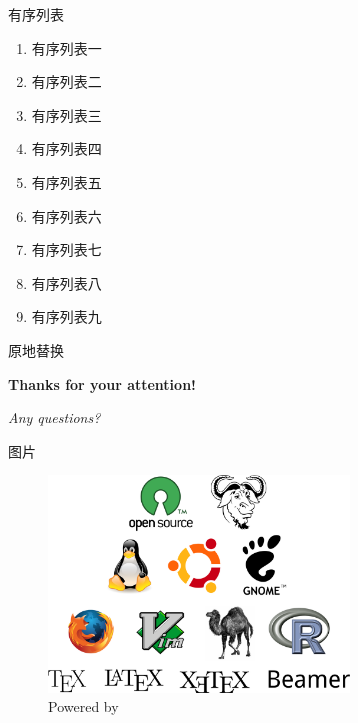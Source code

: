 \begin{frame}{有序列表}
    \begin{enumerate}[<+-|alert@+>]
        \item 有序列表一
        \item 有序列表二
        \item 有序列表三
        \item 有序列表四
        \item 有序列表五
        \item 有序列表六
        \item 有序列表七
        \item 有序列表八
        \item 有序列表九
    \end{enumerate}
\end{frame}

\begin{frame}{原地替换}

\end{frame}

\begin{frame}[plain]
        \begin{spacing}{1.5}
        \begin{center}
        \Huge{\textbf{Thanks for your attention!}}

        \Huge{\textit{Any questions?}}
\end{center}
\end{spacing}
\end{frame}

\begin{frame}{图片}
    \begin{figure}[htbp]
    \centering
    \includegraphics[width=8cm]{power.png}
    \caption{Powered by}
    \label{fig:power}
    \end{figure}
\end{frame}

